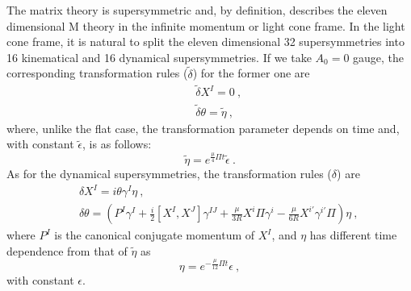 \documentclass[a4paper,12pt]{article}
\begin{document}
The matrix theory is supersymmetric and, by definition, describes the
eleven dimensional M theory in the infinite momentum or light cone
frame.  In the light cone frame, it is natural to split the eleven
dimensional 32 supersymmetries into 16 kinematical and 16 dynamical
supersymmetries.  If we take $A_0=0$ gauge, the corresponding
transformation rules ($\tilde{\delta}$) for the former one are
\begin{eqnarray}
& &\tilde{\delta} X^I = 0~,
                    \nonumber \\
& &\tilde{\delta} \theta= \tilde{\eta}~, \label{kin}
\end{eqnarray}
where, unlike the flat case, the transformation parameter depends
on time and, with constant $\tilde{\epsilon}$, is as follows:
\begin{equation}
\tilde{\eta} = e^{\frac{\mu}{4} \Pi t} \tilde{\epsilon}~.
\end{equation}
As for the dynamical supersymmetries, the transformation rules
($\delta$) are
\begin{eqnarray}
& & \delta X^I = i \theta \gamma^I \eta~,
                    \nonumber \\
& & \delta \theta  =
  \left(
     P^I \gamma^I
  + \frac{i}{2} [X^I, X^J] \gamma^{IJ}
  + \frac{\mu}{3R} X^i \Pi \gamma^i
  - \frac{\mu}{6R} X^{i'} \gamma^{i'}\Pi
  \right) \eta~,
  \label{dyn}
\end{eqnarray}
where $P^I$ is the canonical conjugate momentum of $X^I$, and
$\eta$ has different time dependence from that of $\tilde{\eta}$
as
\begin{equation}
\eta = e^{- \frac{\mu}{12} \Pi t } \epsilon~,
\end{equation}
with constant $\epsilon$.
\end{document}
